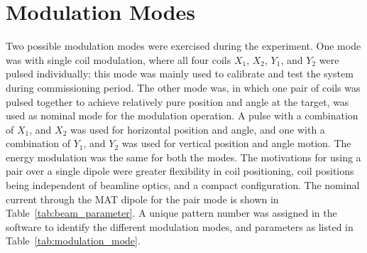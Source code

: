 \section{Modulation Modes}
\label{Modulation Modes}
Two possible modulation modes were exercised during the experiment. One mode was with single coil modulation, where all four coils $X_{1}$, $X_{2}$, $Y_{1}$, and $Y_{2}$ were pulsed individually; this mode was mainly used to calibrate and test the system during commissioning period. The other mode was, in which one pair of coils was pulsed together to achieve relatively pure position and angle at the target, was used as nominal mode for the modulation operation. A pulse with a combination of $X_{1}$, and $X_{2}$ was used for horizontal position and angle, and one with a combination of $Y_{1}$, and $Y_{2}$ was used for vertical position and angle motion. The energy modulation was the same for both the modes. The motivations for using a pair over a single dipole were greater flexibility in coil positioning, coil positions being independent of beamline optics, and a compact configuration. The nominal current through the MAT dipole for the pair mode is shown in Table~\ref{tab:beam_parameter}. A unique pattern number was assigned in the software to identify the different modulation modes, and parameters as listed in Table~\ref{tab:modulation_mode}.

